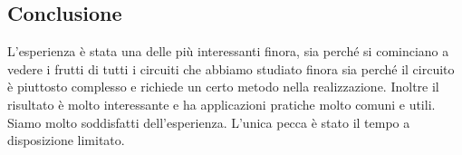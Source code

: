\subsection{Conclusione}

L'esperienza è stata una delle più interessanti finora, sia perché si cominciano a vedere i frutti
di tutti i circuiti che abbiamo studiato finora sia perché il circuito è piuttosto complesso e richiede
un certo metodo nella realizzazione. Inoltre il risultato è molto interessante e ha applicazioni pratiche
molto comuni e utili. Siamo molto soddisfatti dell'esperienza. L'unica pecca è stato il tempo a disposizione
limitato.